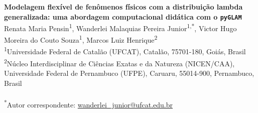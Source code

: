 \begin{center}
{\Large\bfseries Modelagem flexível de fenômenos físicos com a distribuição lambda
generalizada: uma abordagem computacional didática com o \texttt{pyGLAM}}
\\[2ex]

{\small
  Renata Maria Pensin\textsuperscript{1},
  Wanderlei Malaquias Pereira Junior\textsuperscript{1,*},
  Victor Hugo Moreira do Couto Souza\textsuperscript{1},
  Marcos Luiz Henrique\textsuperscript{2}
}
\\[1ex]

{\footnotesize
  \textsuperscript{1}Universidade Federal de Catal\~ao (UFCAT), Catal\~ao,
  75701-180, Goi\'as, Brasil \\[0.3ex]
  \textsuperscript{2}N\'ucleo Interdisciplinar de Ci\^encias Exatas e da
  Natureza (NICEN/CAA), Universidade Federal de Pernambuco (UFPE), Caruaru,
  55014-900, Pernambuco, Brasil
}
\\[0.8ex]

\\[0.8ex]

{\footnotesize \textsuperscript{*}Autor correspondente:
\href{mailto:wanderlei_junior@ufcat.edu.br}{wanderlei\_junior@ufcat.edu.br}}
\end{center}
